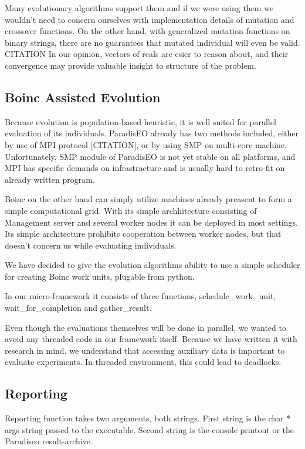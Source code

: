 \documentclass[12pt,oneside,draft]{fithesis2}
\begin{document}
Many evolutionary algorithms support them and if we were using them we wouldn't need to concern ourselves with implementation details of mutation and crossover functions. On the other hand, with generalized mutation functions on binary strings, there are no guarantees that mutated individual will even be valid. CITATION In our opinion, vectors of reals are esier to reason about, and their convergence may provide valuable insight to structure of the problem.

\subsection{Boinc Assisted Evolution}

Because evolution is population-based heuristic, it is well suited for parallel evaluation of its individuals. ParadisEO already has two methods included, either by use of MPI protocol [CITATION], or by using SMP on multi-core machine. Unfortunately, SMP module of ParadisEO is not yet stable on all platforms, and MPI has specific demands on infrastracture and is usually hard to retro-fit on already written program. 

Boinc on the other hand  can simply utilize machines already preasent to form a simple computational grid. With its simple archhitecture consisting of Management server and several worker nodes it can be deployed in most settings. Its simple architecture prohibits cooperation between worker nodes, but that doesn't concern us while evaluating individuals.

We have decided to give the evolution algorithms ability to use a simple scheduler for creating Boinc work units, plugable from python.

In our micro-framework it consists of three functions, schedule\_work\_unit, wait\_for\_completion and gather\_result.

Even though the evaluations themselves will be done in parallel, we wanted to avoid any threaded code in our framework itself. Because we have written it with research in mind, we understand that accessing auxiliary data is important to evaluate experiments. In threaded environment, this could lead to deadlocks.

\subsection{Reporting}

Reporting function takes two arguments, both strings. First string is the char * args string passed to the executable. Second string is the console printout or the Paradiseo result-archive.
\end{document}
